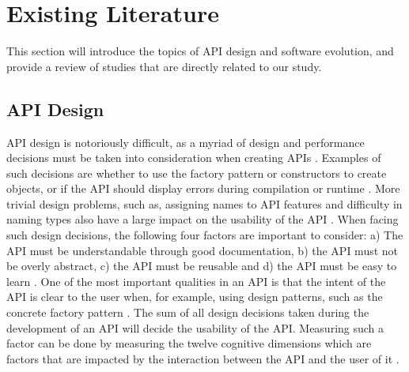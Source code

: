 \documentclass[conference]{IEEEtran}
\begin{document}
\section{Existing Literature} \label{existing_literature}
This section will introduce the topics of API design and software evolution, and provide a review of studies that are directly related to our study. 


\subsection{API Design} \label{api_design}
API design is notoriously difficult, as a myriad of design and performance decisions must be taken into consideration when creating APIs \cite{stylos2006comparing} \cite{afonso2012evaluating} \cite{bloch2008effective}. Examples of such decisions are whether to use the factory pattern or constructors to create objects, or if the API should display errors during compilation or runtime \cite{stylos2006comparing}. More trivial design problems, such as, assigning names to API features and difficulty in naming types also have a large impact on the usability of the API \cite{shi2011empirical}. When facing such design decisions, the following four factors are important to consider: a) The API  must be understandable through good documentation, b) the API must not be overly abstract, c) the API must be reusable and d) the API must be easy to learn \cite{shi2011empirical}. One of the most important qualities in an API is that the intent of the API is clear to the user when, for example, using design patterns, such as the concrete factory pattern \cite{stylos2006comparing} \cite{shi2011empirical}. The sum of all design decisions taken during the development of an API will decide the usability of the API. Measuring such a factor can be done by measuring the twelve cognitive dimensions which are factors that are impacted by the interaction between the API and the user of it \cite{clarke2004measuring}. 
\end{document}
